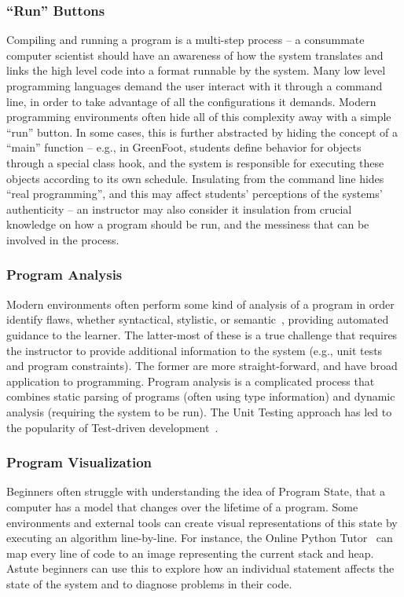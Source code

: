 \subsubsection{``Run'' Buttons}

Compiling and running a program is a multi-step process -- a consummate computer scientist should have an awareness of how the system translates and links the high level code into a format runnable by the system.
Many low level programming languages demand the user interact with it through a command line, in order to take advantage of all the configurations it demands.
Modern programming environments often hide all of this complexity away with a simple ``run'' button.
In some cases, this is further abstracted by hiding the concept of a ``main'' function -- e.g., in GreenFoot, students define behavior for objects through a special class hook, and the system is responsible for executing these objects according to its own schedule.
Insulating from the command line hides ``real programming'', and this may affect students' perceptions of the systems' authenticity -- an instructor may also consider it insulation from crucial knowledge on how a program should be run, and the messiness that can be involved in the process.

\subsubsection{Program Analysis}

Modern environments often perform some kind of analysis of a program in order identify flaws, whether syntactical, stylistic, or semantic~\cite{Ihantola:2010}, providing automated guidance to the learner.
The latter-most of these is a true challenge that requires the instructor to provide additional information to the system (e.g., unit tests and program constraints).
The former are more straight-forward, and have broad application to programming.
Program analysis is a complicated process that combines static parsing of programs (often using type information) and dynamic analysis (requiring the system to be run).
The Unit Testing approach has led to the popularity of Test-driven development~\cite{webcat}.

\subsubsection{Program Visualization}

Beginners often struggle with understanding the idea of Program State, that a computer has a model that changes over the lifetime of a program.
Some environments and external tools can create visual representations of this state by executing an algorithm line-by-line.
For instance, the Online Python Tutor~\cite{Guo:2013} can map every line of code to an image representing the current stack and heap. 
Astute beginners can use this to explore how an individual statement affects the state of the system and to diagnose problems in their code.

